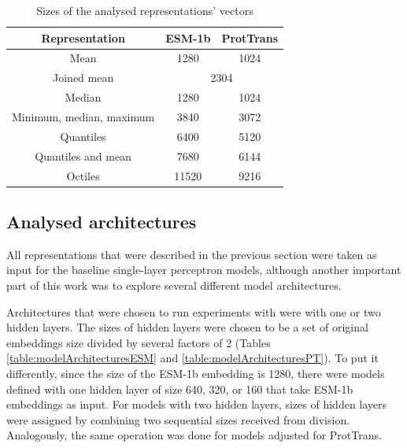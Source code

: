 \documentclass[12pt]{article}
\begin{document}
    \newpage

	\begin{table}[h!]
		\caption{Sizes of the analysed representations' vectors}
		\vspace{0.2cm}
		\centering
		\begin{tabular}{ | c | c c | }
			\hline 
			Representation & ESM-1b & ProtTrans \\
			\hline 
			Mean & 1280 & 1024 \\
			Joined mean & \multicolumn{2}{c|}{2304} \\
			Median & 1280 & 1024 \\
			Minimum, median, maximum & 3840 & 3072 \\
			Quantiles & 6400 & 5120 \\
			Quantiles and mean & 7680 & 6144 \\
			Octiles & 11520 & 9216 \\
			\hline    
		\end{tabular}
		\label{table:vectorsDimensions}
	\end{table}

	\newpage

	\subsection{Analysed architectures}

	All representations that were described
	in the previous section were taken as input for the baseline
	single-layer perceptron models, although another important part 
	of this work was to explore several different 
	model architectures. 

	Architectures that were chosen to run experiments with were
	with one or two hidden layers. The sizes of hidden layers 
	were chosen to be a set of original embeddings size divided 
	by several factors of 2 (Tables \ref{table:modelArchitecturesESM} 
	and \ref{table:modelArchitecturesPT}). To put it differently, since the 
	size of the ESM-1b embedding is 1280, there were 
	models defined with one hidden layer of size 640, 320, or 160 
	that take ESM-1b embeddings as input. For models with two 
	hidden layers, sizes of hidden layers were assigned by 
	combining two sequential sizes received from division. 
	Analogously, the same operation was done for models adjusted 
	for ProtTrans.
\end{document}
